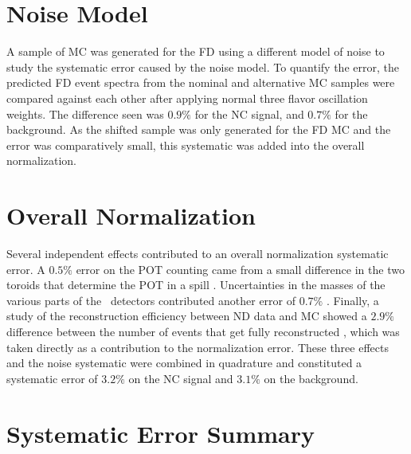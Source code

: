 \section{Noise Model}

A sample of MC was generated for the FD using a different model of noise to study the systematic error caused by the noise model. To quantify the error, the predicted FD event spectra from the nominal and alternative MC samples were compared against each other after applying normal three flavor oscillation weights. The difference seen was $0.9\%$ for the NC signal, and $0.7\%$ for the background. As the shifted sample was only generated for the FD MC and the error was comparatively small, this systematic was added into the overall normalization.

\section{Overall Normalization}

Several independent effects contributed to an overall normalization systematic error. A $0.5\%$ error on the POT counting came from a small difference in the two toroids that determine the POT in a spill \cite{ref:TNBeam}. Uncertainties in the masses of the various parts of the \nova~detectors contributed another error of $0.7\%$ \cite{ref:MassError}. Finally, a study of the reconstruction efficiency between ND data and MC showed a $2.9\%$ difference between the number of events that get fully reconstructed \cite{ref:NDDataMCRecoEff}, which was taken directly as a contribution to the normalization error. These three effects and the noise systematic were combined in quadrature and constituted a systematic error of $3.2\%$ on the NC signal and $3.1\%$ on the background.

\section{Systematic Error Summary}

